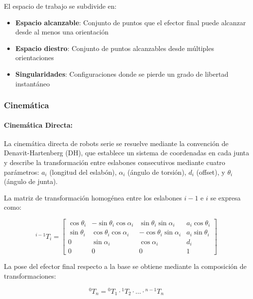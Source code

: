 El espacio de trabajo se subdivide en:

\begin{itemize}
    \item \textbf{Espacio alcanzable}: Conjunto de puntos que el efector final puede alcanzar desde al menos una orientación
    \item \textbf{Espacio diestro}: Conjunto de puntos alcanzables desde múltiples orientaciones
    \item \textbf{Singularidades}: Configuraciones donde se pierde un grado de libertad instantáneo
\end{itemize}

\subsubsection{Cinemática}

\paragraph{Cinemática Directa:} 

La cinemática directa de robots serie se resuelve mediante la convención de Denavit-Hartenberg (DH), que establece un sistema de coordenadas en cada junta y describe la transformación entre eslabones consecutivos mediante cuatro parámetros: $a_i$ (longitud del eslabón), $\alpha_i$ (ángulo de torsión), $d_i$ (offset), y $\theta_i$ (ángulo de junta).

La matriz de transformación homogénea entre los eslabones $i-1$ e $i$ se expresa como:

\begin{equation}
{}^{i-1}T_i = 
\begin{bmatrix}
\cos\theta_i & -\sin\theta_i\cos\alpha_i & \sin\theta_i\sin\alpha_i & a_i\cos\theta_i \\
\sin\theta_i & \cos\theta_i\cos\alpha_i & -\cos\theta_i\sin\alpha_i & a_i\sin\theta_i \\
0 & \sin\alpha_i & \cos\alpha_i & d_i \\
0 & 0 & 0 & 1
\end{bmatrix}
\end{equation}

La pose del efector final respecto a la base se obtiene mediante la composición de transformaciones:

\begin{equation}
{}^0T_n = {}^0T_1 \cdot {}^1T_2 \cdot \ldots \cdot {}^{n-1}T_n
\end{equation}

